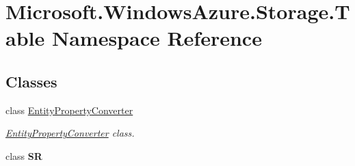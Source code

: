 \hypertarget{namespaceMicrosoft_1_1WindowsAzure_1_1Storage_1_1Table}{}\section{Microsoft.\+Windows\+Azure.\+Storage.\+Table Namespace Reference}
\label{namespaceMicrosoft_1_1WindowsAzure_1_1Storage_1_1Table}
\subsection*{Classes}
\begin{DoxyCompactItemize}
\item 
class \hyperlink{classMicrosoft_1_1WindowsAzure_1_1Storage_1_1Table_1_1EntityPropertyConverter}{Entity\+Property\+Converter}
\begin{DoxyCompactList}\small\item\em \hyperlink{classMicrosoft_1_1WindowsAzure_1_1Storage_1_1Table_1_1EntityPropertyConverter}{Entity\+Property\+Converter} class. \end{DoxyCompactList}\item 
class {\bfseries SR}
\end{DoxyCompactItemize}
